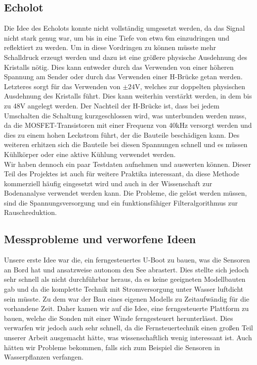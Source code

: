 \documentclass[12pt,a4paper,titlepage,headinclude,bibtotoc]{scrartcl}
\numberwithin{equation}{subsection}
\begin{document}
\subsection{Echolot}
Die Idee des Echolots konnte nicht vollständig umgesetzt werden, da das Signal nicht stark genug war, um bis in eine Tiefe von etwa 6\si{\meter} einzudringen und reflektiert zu werden.
Um in diese Vordringen zu können müsste mehr Schalldruck erzeugt werden und dazu ist eine größere physische Ausdehnung des Kristalls nötig.
Dies kann entweder durch das Verwenden von einer höheren Spannung am Sender oder durch das Verwenden einer H-Brücke getan werden.
Letzteres sorgt für das Verwenden von $\pm24\si{\volt}$, welches zur doppelten physischen Ausdehnung des Kristalls führt.
Dies kann weiterhin verstärkt werden, in dem bis zu 48\si{\volt} angelegt werden.
Der Nachteil der H-Brücke ist, dass bei jedem Umschalten die Schaltung kurzgeschlossen wird, was unterbunden werden muss, da die MOSFET-Transistoren mit einer Frequenz von 40\si{\kilo\hertz} versorgt werden und dies zu einem hohen Leckstrom führt, der die Bauteile beschädigen kann.
Des weiteren erhitzen sich die Bauteile bei diesen Spannungen schnell und es müssen Kühlkörper oder eine aktive Kühlung verwendet werden.\\
Wir haben dennoch ein paar Testdaten aufnehmen und auswerten können.
Dieser Teil des Projektes ist auch für weitere Praktika interessant, da diese Methode kommerziell häufig eingesetzt wird und auch in der Wissenschaft zur Bodenanalyse verwendet werden kann.
Die Probleme, die gelöst werden müssen, sind die Spannungsversorgung und ein funktionsfähiger Filteralgorithmus zur Rauschreduktion.

\subsection{Messprobleme und verworfene Ideen}
Unsere erste Idee war die, ein ferngesteuertes U-Boot zu bauen, was die Sensoren an Bord hat und ansatzweise autonom den See abrastert.
Dies stellte sich jedoch sehr schnell als nicht durchführbar heraus, da es keine geeigneten Modellbauten gab und da die komplette Technik mit Stromversorgung unter Wasser luftdicht sein müsste.
Zu dem war der Bau eines eigenen Modells zu Zeitaufwändig für die vorhandene Zeit.
Daher kamen wir auf die Idee, eine ferngesteuerte Plattform zu bauen, welche die Sonden mit einer Winde ferngesteuert herunterlässt.
Dies verwarfen wir jedoch auch sehr schnell, da die Fernsteuertechnik einen großen Teil unserer Arbeit ausgemacht hätte, was wissenschaftlich wenig interessant ist.
Auch hätten wir Probleme bekommen, falls sich zum Beispiel die Sensoren in Wasserpflanzen verfangen.
\end{document}
